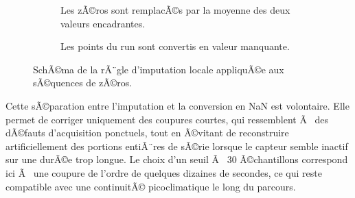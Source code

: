 \documentclass{article}
\begin{document}
\begin{figure}[H]
\centering

\begin{subfigure}[t]{0.49\textwidth}
\centering
{}
\caption{Les zÃ©ros sont remplacÃ©s par la moyenne des deux valeurs encadrantes.}
\end{subfigure}
\hfill
\begin{subfigure}[t]{0.49\textwidth}
\centering
{}
\caption{Les points du run sont convertis en valeur manquante.}
\end{subfigure}

\caption{SchÃ©ma de la rÃ¨gle d'imputation locale appliquÃ©e aux sÃ©quences de zÃ©ros.}
\label{fig:schema_imputation_zero}
\end{figure}

Cette sÃ©paration entre l'imputation et la conversion en NaN est volontaire. Elle permet de corriger uniquement des coupures courtes, qui ressemblent Ã  des dÃ©fauts d'acquisition ponctuels, tout en Ã©vitant de reconstruire artificiellement des portions entiÃ¨res de sÃ©rie lorsque le capteur semble inactif sur une durÃ©e trop longue. Le choix d'un seuil Ã  30 Ã©chantillons correspond ici Ã  une coupure de l'ordre de quelques dizaines de secondes, ce qui reste compatible avec une continuitÃ© picoclimatique le long du parcours.
\end{document}

